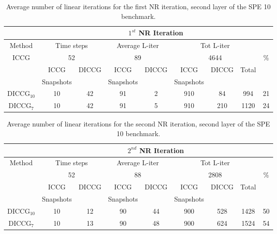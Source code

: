 \documentclass[12pt]{article}
\begin{document}
\begin{table}[!ht]\centering
\begin{minipage}{1\textwidth}
\vspace{-10pt}
\centering
\begin{tabular}{ |c|c|c|c|c|c|c|c|c|} 
  \hline
  & \multicolumn{8}{c|}{$1^{st}$ NR Iteration}  \\
\hline
Method&  \multicolumn{2}{c|}{Time steps} &\multicolumn{2}{c|}{Average L-iter} & \multicolumn{3}{c|}{Tot L-iter}&\\
\hline
 ICCG&\multicolumn{2}{c|}{52} & \multicolumn{2}{c|}{89}& \multicolumn{3}{c|}{4644} &\%\\
\hline
&ICCG&DICCG&ICCG&DICCG&ICCG&DICCG&Total&\\
&Snapshots&&Snapshots&&Snapshots&&&\\
\hline
DICCG$_{10}$&10&42&91&2&910&84&994&21 \\
DICCG$_7$ &10&42&91&5&910&210&1120&24  \\
\hline
 \end{tabular}
\caption{Average number of linear iterations for the first NR iteration, second layer of the SPE 10 benchmark.}\label{table:literspe1}
\end{minipage}
\end{table}


\begin{table}[!ht]\centering
\begin{minipage}{1\textwidth}
\vspace{-10pt}
\centering
\begin{tabular}{ |c|c|c|c|c|c|c|c|c|} 
  \hline
  & \multicolumn{8}{c|}{$2^{nd}$ NR Iteration}  \\
\hline
Method&  \multicolumn{2}{c|}{Time steps} &\multicolumn{2}{c|}{Average L-iter} & \multicolumn{3}{c|}{Tot L-iter}&\\
\hline
 &\multicolumn{2}{c|}{52} & \multicolumn{2}{c|}{88}& \multicolumn{3}{c|}{2808} &\%\\
\hline
&ICCG&DICCG&ICCG&DICCG&ICCG&DICCG&Total&\\
&Snapshots&&Snapshots&&Snapshots&&&\\
\hline
DICCG$_{10}$&10&12&90&44&900&528&1428&50 \\
DICCG$_7$ &10&13&90&48&900&624&1524&54  \\
\hline
 \end{tabular}
\caption{Average number of linear iterations for the second NR iteration, second layer of the SPE 10 benchmark.}\label{table:literspe2}
\end{minipage}
\end{table}
\end{document}
